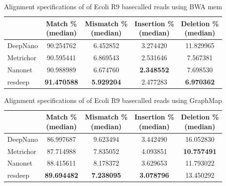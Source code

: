 \documentclass[times, utf8, diplomski, numeric, english]{fer}
\begin{document}
\begin{table}[htb]
	\caption{Alignment specifications of of Ecoli R9 basecalled reads using BWA mem}
	\label{tbl:ecoli_rates_bwa}
	\centering
	\begin{tabular}{lcccc}
		\toprule
		{} &  \thead{Match \% \\(median)} &  \thead{Mismatch \% \\(median)} &  \thead{Insertion \% \\(median)} &  \thead{Deletion \% \\(median)} \\
		\midrule
		DeepNano   &                  90.254762 &                      6.452852 &                       3.274420 &                     11.829965 \\
		Metrichor  &                  90.595441 &                      6.869543 &                       2.531646 &                      7.567381 \\
		Nanonet    &                  90.988989 &                      6.674760 &                     \textbf{  2.348552} &                      7.698530 \\
		resdeep    &                 \textbf{ 91.470588} &                      \textbf{5.929204 }&                       2.477283 &                     \textbf{ 6.970362} \\
		\bottomrule
	\end{tabular}
	
\end{table}
\begin{table}[htb]
	\caption{Alignment specifications of of Ecoli R9 basecalled reads using GraphMap}
	\label{tbl:lambda_rates}
	\centering
	\begin{tabular}{lcccc}
		\toprule
		{} &  \thead{Match \% \\(median)} &  \thead{Mismatch \% \\(median)} &  \thead{Insertion \% \\(median)} &  \thead{Deletion \% \\(median)} \\
		\midrule
		DeepNano   &                  86.997687 &                      9.623494 &                       3.442490 &                     16.052830 \\
		Metrichor  &                  87.714988 &                      7.835052 &                       4.093851 &                     \textbf{10.757491} \\
		Nanonet    &                  88.415611 &                      8.178372 &                       3.629653 &                     11.793022 \\
		resdeep    &                 \textbf{ 89.694482} &                     \textbf{ 7.238095} &                       \textbf{3.078796} &                     13.450292 \\
		\bottomrule
	\end{tabular}
	
	
	
	
\end{table}
\end{document}
